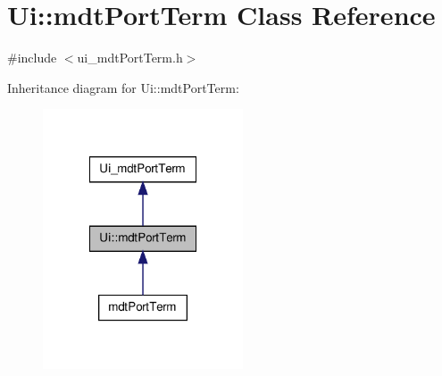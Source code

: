 \hypertarget{class_ui_1_1mdt_port_term}{\section{Ui\-:\-:mdt\-Port\-Term Class Reference}
\label{class_ui_1_1mdt_port_term}
}


{\ttfamily \#include $<$ui\-\_\-mdt\-Port\-Term.\-h$>$}



Inheritance diagram for Ui\-:\-:mdt\-Port\-Term\-:
\nopagebreak
\begin{figure}[H]
\begin{center}
\leavevmode
\includegraphics[width=168pt]{class_ui_1_1mdt_port_term__inherit__graph}
\end{center}
\end{figure}


